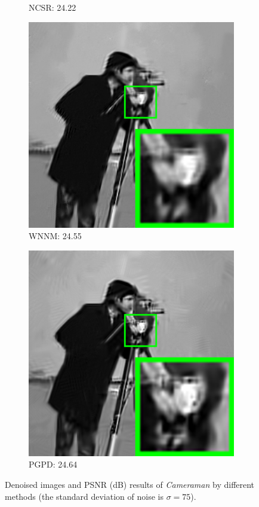 \begin{figure}
\begin{subfigure}[t]{0.24\textwidth}
		\caption{NCSR: 24.22}
    \end{subfigure}
    \hfill
    \begin{subfigure}[t]{0.24\textwidth}
        \centering
        \includegraphics[width=1\textwidth]{images/pgpd/br_WNNM_75_cameraman.png}
		\caption{WNNM: 24.55}
    \end{subfigure}
    \hfill
    \begin{subfigure}[t]{0.24\textwidth}
        \centering
        \includegraphics[width=1\textwidth]{images/pgpd/br_our_75_cameraman.png}
		\caption{PGPD: 24.64}
    \end{subfigure}
    \caption{Denoised images and PSNR (dB) results of \textsl{Cameraman} by different methods (the standard deviation of noise is $\sigma=75$).}
    \label{fig2-13}
\end{figure}

